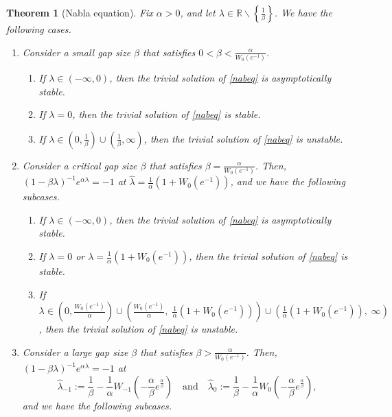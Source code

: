 \documentclass[12pt,reqno]{amsart}
\theoremstyle{plain}
\newtheorem{theorem}{Theorem}
\theoremstyle{definition}
\newcommand{\R}{\ensuremath{\mathbb{R}}}
\numberwithin{equation}{section}
\numberwithin{theorem}{section}
\begin{document}

\begin{theorem}[Nabla equation]\label{realnablathm}
Fix $\alpha>0$, and let $\lambda\in\R\backslash\left\{\frac{1}{\beta}\right\}$. We have the following cases.
\begin{enumerate}
 \item Consider a small gap size $\beta$ that satisfies $0<\beta<\frac{\alpha}{W_0(e^{-1})}$.
  \begin{enumerate}
    \item If $\lambda\in(-\infty,0)$, then the trivial solution of \eqref{nabeq} is asymptotically stable. 
    \item If $\lambda=0$, then the trivial solution of \eqref{nabeq} is stable. 
    \item If $\lambda\in\left(0,\frac{1}{\beta}\right)\cup\left(\frac{1}{\beta},\infty\right)$, then the trivial solution of \eqref{nabeq} is unstable.
  \end{enumerate}
\item Consider a critical gap size $\beta$ that satisfies $\beta=\frac{\alpha}{W_0(e^{-1})}$. Then, $(1-\beta\lambda)^{-1}e^{\alpha\lambda}=-1$ at $\widehat{\lambda}=\frac{1}{\alpha}\left(1+W_0(e^{-1})\right)$, and we have the following subcases.
\begin{enumerate}
    \item If $\lambda\in(-\infty,0)$, then the trivial solution of \eqref{nabeq} is asymptotically stable.  
    \item If $\lambda=0$ or $\lambda=\frac{1}{\alpha}\left(1+W_0(e^{-1})\right)$, then the trivial solution of \eqref{nabeq} is stable.
    \item If $\lambda\in\left(0,\frac{W_0(e^{-1})}{\alpha}\right)\cup\left(\frac{W_0(e^{-1})}{\alpha},\;\frac{1}{\alpha}\left(1+W_0(e^{-1})\right)\right)\cup\left(\frac{1}{\alpha}\left(1+W_0(e^{-1})\right),\;\infty\right)$, then the trivial solution of \eqref{nabeq} is unstable.
\end{enumerate}
\item Consider a large gap size $\beta$ that satisfies $\beta>\frac{\alpha}{W_0(e^{-1})}$. Then, $(1-\beta\lambda)^{-1}e^{\alpha\lambda}=-1$ at 
      $$ \widehat{\lambda}_{-1}:=\frac{1}{\beta}-\frac{1}{\alpha}W_{-1}\left(-\frac{\alpha}{\beta}e^{\frac{\alpha}{\beta}}\right) \quad\text{and}\quad   
			\widehat{\lambda}_{0}:=\frac{1}{\beta}-\frac{1}{\alpha}W_{0}\left(-\frac{\alpha}{\beta}e^{\frac{\alpha}{\beta}}\right), $$ 
			and we have the following subcases.

\end{enumerate}
\end{theorem}
\end{document}
